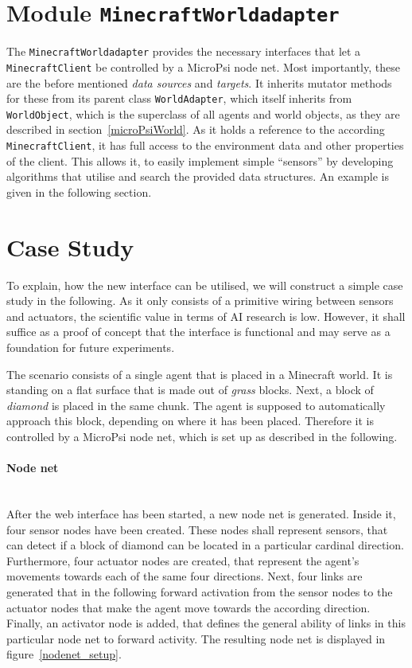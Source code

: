     \section{Module \texttt{MinecraftWorldadapter}}

The \texttt{MinecraftWorldadapter} provides the necessary interfaces that let a \texttt{MinecraftClient} be controlled by a MicroPsi node net. Most importantly, these are the before mentioned \emph{data sources} and \emph{targets}. It inherits mutator methods for these from its parent class \texttt{WorldAdapter}, which itself inherits from \texttt{WorldObject}, which is the superclass of all agents and world objects, as they are described in section~\ref{microPsiWorld}. As it holds a reference to the according \texttt{MinecraftClient}, it has full access to the environment data and other properties of the client. This allows it, to easily implement simple ``sensors'' by developing algorithms that utilise and search the provided data structures. An example is given in the following section.
    
    \section{Case Study}
    \label{case_study}

To explain, how the new interface can be utilised, we will construct a simple case study in the following. As it only consists of a primitive wiring between sensors and actuators, the scientific value in terms of AI research is low. However, it shall suffice as a proof of concept that the interface is functional and may serve as a foundation for future experiments.

The scenario consists of a single agent that is placed in a Minecraft world. It is standing on a flat surface that is made out of \emph{grass} blocks. Next, a block of \emph{diamond} is placed in the same chunk. The agent is supposed to automatically approach this block, depending on where it has been placed. Therefore it is controlled by a MicroPsi node net, which is set up as described in the following.

\paragraph{Node net}$\;$ \\

After the web interface has been started, a new node net is generated. Inside it, four sensor nodes have been created. These nodes shall represent sensors, that can detect if a block of diamond can be located in a particular cardinal direction. Furthermore, four actuator nodes are created, that represent the agent's movements towards each of the same four directions. Next, four links are generated that in the following forward activation from the sensor nodes to the actuator nodes that make the agent move towards the according direction. Finally, an activator node is added, that defines the general ability of links in this particular node net to forward activity. The resulting node net is displayed in figure~\ref{nodenet_setup}.

